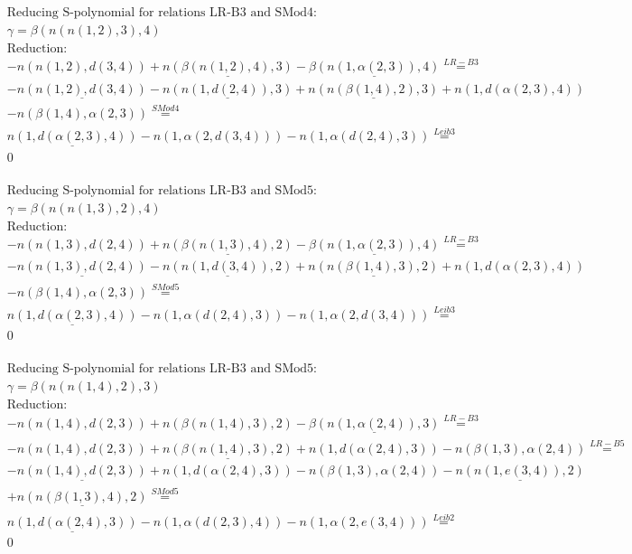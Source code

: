 \documentclass[11pt]{amsart}
\begin{document}
\begin{align*} 
& \text{Reducing S-polynomial for relations LR-B3 and SMod4:} \\ 
& \gamma = \beta(n(n(1,2),3),4) \\ 
& \text{Reduction}: \\& - n(n(1,2),d(3,4)) + \underline{n(\beta(n(1,2),4),3)} - \underline{\beta(n(1,\alpha(2,3)),4)} \stackrel{ LR-B3 }{=}  \\ 
& - \underline{n(n(1,2),d(3,4))} - \underline{n(n(1,d(2,4)),3)} + \underline{n(n(\beta(1,4),2),3)} + n(1,d(\alpha(2,3),4))\\ 
 &  - n(\beta(1,4),\alpha(2,3)) \stackrel{ SMod4 }{=}  \\ 
&\underline{n(1,d(\alpha(2,3),4))} - n(1,\alpha(2,d(3,4))) - n(1,\alpha(d(2,4),3)) \stackrel{ Leib3 }{=}  \\ 
&0\\ 
\end{align*} 
 
\begin{align*} 
& \text{Reducing S-polynomial for relations LR-B3 and SMod5:} \\ 
& \gamma = \beta(n(n(1,3),2),4) \\ 
& \text{Reduction}: \\& - n(n(1,3),d(2,4)) + \underline{n(\beta(n(1,3),4),2)} - \underline{\beta(n(1,\alpha(2,3)),4)} \stackrel{ LR-B3 }{=}  \\ 
& - \underline{n(n(1,3),d(2,4))} - \underline{n(n(1,d(3,4)),2)} + \underline{n(n(\beta(1,4),3),2)} + n(1,d(\alpha(2,3),4))\\ 
 &  - n(\beta(1,4),\alpha(2,3)) \stackrel{ SMod5 }{=}  \\ 
&\underline{n(1,d(\alpha(2,3),4))} - n(1,\alpha(d(2,4),3)) - n(1,\alpha(2,d(3,4))) \stackrel{ Leib3 }{=}  \\ 
&0\\ 
\end{align*} 
 
\begin{align*} 
& \text{Reducing S-polynomial for relations LR-B3 and SMod5:} \\ 
& \gamma = \beta(n(n(1,4),2),3) \\ 
& \text{Reduction}: \\& - n(n(1,4),d(2,3)) + n(\beta(n(1,4),3),2) - \underline{\beta(n(1,\alpha(2,4)),3)} \stackrel{ LR-B3 }{=}  \\ 
& - n(n(1,4),d(2,3)) + \underline{n(\beta(n(1,4),3),2)} + n(1,d(\alpha(2,4),3)) - n(\beta(1,3),\alpha(2,4)) \stackrel{ LR-B5 }{=}  \\ 
& - \underline{n(n(1,4),d(2,3))} + n(1,d(\alpha(2,4),3)) - n(\beta(1,3),\alpha(2,4)) - \underline{n(n(1,e(3,4)),2)}\\ 
 &  + \underline{n(n(\beta(1,3),4),2)} \stackrel{ SMod5 }{=}  \\ 
&\underline{n(1,d(\alpha(2,4),3))} - n(1,\alpha(d(2,3),4)) - n(1,\alpha(2,e(3,4))) \stackrel{ Leib2 }{=}  \\ 
&0\\ 
\end{align*} 
 
\end{document}

